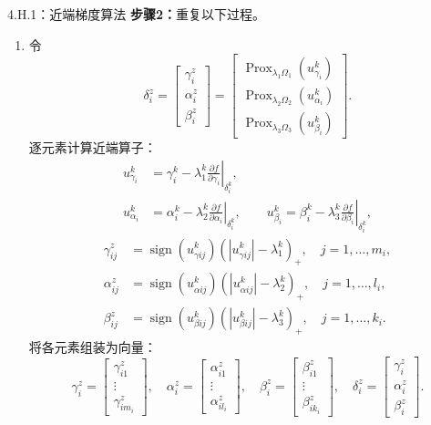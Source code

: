 \begin{bookalgorithm}{4.H.1：近端梯度算法}
\textbf{步骤2：}重复以下过程。
\begin{enumerate}
\item 令
\[
\delta_i^z=\begin{bmatrix}\gamma_i^z\\\alpha_i^z\\\beta_i^z\end{bmatrix}
=\begin{bmatrix}
\operatorname{Prox}_{\lambda_1\Omega_1}(u_{\gamma_i}^k)\\
\operatorname{Prox}_{\lambda_2\Omega_2}(u_{\alpha_i}^k)\\
\operatorname{Prox}_{\lambda_3\Omega_3}(u_{\beta_i}^k)
\end{bmatrix}.
\]
逐元素计算近端算子：
\[
\begin{aligned}
u_{\gamma_i}^k&=\gamma_i^k-\lambda_1^k\left.\frac{\partial f}{\partial\gamma_i}\right|_{\delta_i^k},\\
u_{\alpha_i}^k&=\alpha_i^k-\lambda_2^k\left.\frac{\partial f}{\partial\alpha_i}\right|_{\delta_i^k},\qquad
u_{\beta_i}^k=\beta_i^k-\lambda_3^k\left.\frac{\partial f}{\partial\beta_i}\right|_{\delta_i^k},
\end{aligned}
\]
\[
\begin{aligned}
\gamma_{ij}^z&=\operatorname{sign}(u_{\gamma ij}^k)(|u_{\gamma ij}^k|-\lambda_1^k)_+,
\quad j=1,\ldots,m_i,\\
\alpha_{ij}^z&=\operatorname{sign}(u_{\alpha ij}^k)(|u_{\alpha ij}^k|-\lambda_2^k)_+,
\quad j=1,\ldots,l_i,\\
\beta_{ij}^z&=\operatorname{sign}(u_{\beta ij}^k)(|u_{\beta ij}^k|-\lambda_3^k)_+,
\quad j=1,\ldots,k_i.
\end{aligned}
\]
将各元素组装为向量：
\[
\gamma_i^z=\begin{bmatrix}\gamma_{i1}^z\\\vdots\\\gamma_{im_i}^z\end{bmatrix},\quad
\alpha_i^z=\begin{bmatrix}\alpha_{i1}^z\\\vdots\\\alpha_{il_i}^z\end{bmatrix},\quad
\beta_i^z=\begin{bmatrix}\beta_{i1}^z\\\vdots\\\beta_{ik_i}^z\end{bmatrix},\quad
\delta_i^z=\begin{bmatrix}\gamma_i^z\\\alpha_i^z\\\beta_i^z\end{bmatrix}.
\]
\end{enumerate}
\end{bookalgorithm}
